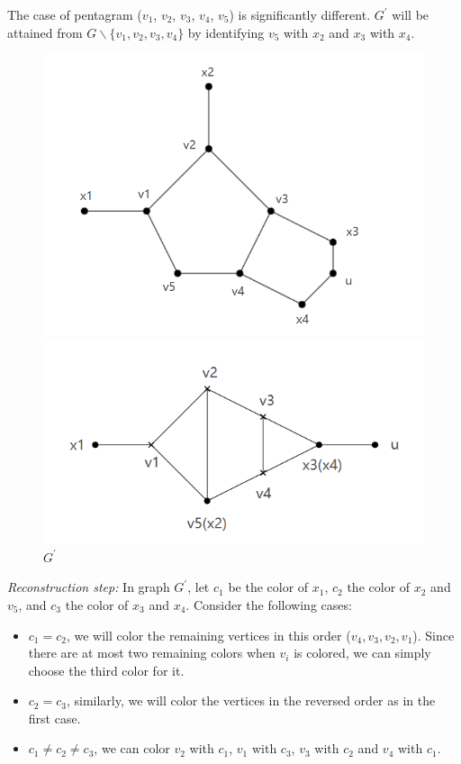 The case of pentagram ($v_1$, $v_2$, $v_3$, $v_4$, $v_5$) is significantly different. $G^{'}$ will be attained from $G \backslash \{v_1, v_2, v_3, v_4\}$ by identifying $v_5$ with $x_2$ and $x_3$ with $x_4$.

\begin{figure}[htbp]
\centering
\begin{minipage}[t]{0.48\textwidth}
\centering
\includegraphics[width=1\textwidth]{figure/pentagram.png}
\caption{$G$}
\end{minipage}
\begin{minipage}[t]{0.48\textwidth}
\centering
\includegraphics[width=1\textwidth]{figure/pentagram_prime.png}
\caption{$G^{'}$}
\end{minipage}
\end{figure}

\textit{Reconstruction step: }In graph $G^{'}$, let $c_1$ be the color of $x_1$, $c_2$ the color of $x_2$ and $v_5$, and $c_3$ the color of $x_3$ and $x_4$. Consider the following cases:
\begin{itemize}
    \item $c_1 = c_2$, we will color the remaining vertices in this order ($v_4, v_3, v_2, v_1$). Since there are at most two remaining colors when $v_i$ is colored, we can simply choose the third color for it. 
    \item $c_2 = c_3$, similarly, we will color the vertices in the reversed order as in the first case.
    \item $c_1 \ne c_2 \ne c_3$, we can color $v_2$ with $c_1$, $v_1$ with $c_3$, $v_3$ with $c_2$ and $v_4$ with $c_1$.
\end{itemize}

